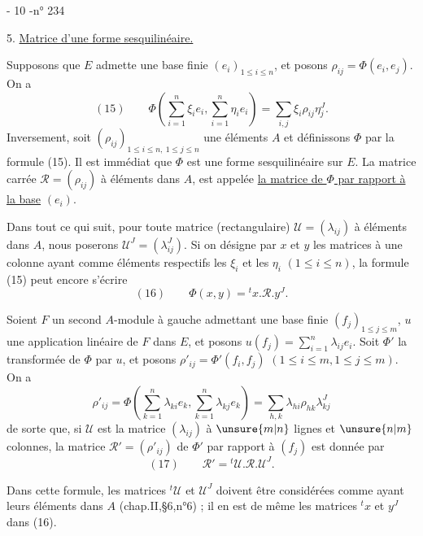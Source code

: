
- 10 -\hfill n° 234

5. \uline{Matrice d'une forme sesquilinéaire.}

Supposons que $E$ admette une base finie $(e_i)_{1\leq i\leq n}$, et posons
$\rho_{ij}=\Phi(e_i,e_j)$. On a
\[
(15)\qquad
\Phi\left(\sum_{i=1}^n\xi_i e_i,\sum_{i=1}^n\eta_i e_i\right)
=\sum_{i,j}\xi_i\rho_{ij}\eta_j^J.
\]
Inversement, soit $(\rho_{ij})_{1\leq i\leq n,\ 1\leq j\leq n}$ une
 éléments  $A$
et définissons $\Phi$ par la formule (15). Il est immédiat que $\Phi$ est une forme sesquilinéaire sur $E$.
La matrice carrée $\mathcal R=(\rho_{ij})$ à éléments dans $A$, est appelée
\uline{la matrice de $\Phi$ par rapport à la base} $(e_i)$.

Dans tout ce qui suit, pour toute matrice (rectangulaire) $\mathcal U=(\lambda_{ij})$ à éléments dans $A$, nous poserons $\mathcal U^J=(\lambda_{ij}^J)$.
Si on désigne par $x$ et $y$ les matrices à une colonne ayant comme éléments respectifs les $\xi_i$ et les $\eta_i$ $(1\leq i\leq n)$, la formule (15) peut encore s'écrire
\[
(16)\qquad \Phi(x,y)={}^t x.\mathcal R.y^J.
\]

Soient $F$ un second $A$-module à gauche admettant une base finie $(f_j)_{1\leq j\leq m}$,
$u$ une application linéaire de $F$ dans $E$, et posons
$u(f_j)=\sum_{i=1}^n\lambda_{ij}e_i$. Soit $\Phi'$ la transformée de $\Phi$ par $u$, et posons
$\rho'_{ij}=\Phi'(f_i,f_j)$ $(1\leq i\leq m,1\leq j\leq m)$. On a
\[
\rho'_{ij}=\Phi\left(\sum_{k=1}^n\lambda_{ki}e_k,\sum_{k=1}^n\lambda_{kj}e_k\right)
=\sum_{h,k}\lambda_{hi}\rho_{hk}\lambda_{kj}^J
\]
de sorte que, si $\mathcal U$ est la matrice $(\lambda_{ij})$ à $\unsure{m|n}$ lignes et $\unsure{n|m}$ colonnes,
la matrice $\mathcal R'=(\rho'_{ij})$ de $\Phi'$ par rapport à $(f_j)$ est donnée par
\[
(17)\qquad \mathcal R'={}^t\mathcal U.\mathcal R.\mathcal U^J.
\]

Dans cette formule, les matrices ${}^t\mathcal U$ et $\mathcal U^J$ doivent être considérées comme ayant leurs éléments dans $A$ (chap.II,\S6,n°6) ; il en est de même les matrices ${}^t x$ et $y^J$ dans (16).
